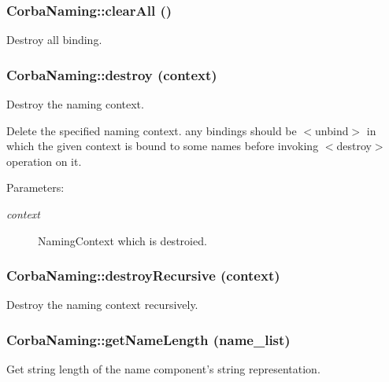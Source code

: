 \subsubsection{\setlength{\rightskip}{0pt plus 5cm}Corba\-Naming::clear\-All ()}\label{classCorbaNaming_CorbaNaminga19}


Destroy all binding. 

\subsubsection{\setlength{\rightskip}{0pt plus 5cm}Corba\-Naming::destroy (context)}\label{classCorbaNaming_CorbaNaminga17}


Destroy the naming context. 

Delete the specified naming context. any bindings should be $<$unbind$>$ in which the given context is bound to some names before invoking $<$destroy$>$ operation on it. \begin{Desc}
\item[Parameters:]
\begin{description}
\item[{\em context}]Naming\-Context which is destroied.\end{description}
\end{Desc}
\subsubsection{\setlength{\rightskip}{0pt plus 5cm}Corba\-Naming::destroy\-Recursive (context)}\label{classCorbaNaming_CorbaNaminga18}


Destroy the naming context recursively. 

\subsubsection{\setlength{\rightskip}{0pt plus 5cm}Corba\-Naming::get\-Name\-Length (name\_\-list)}\label{classCorbaNaming_CorbaNaminga33}


Get string length of the name component's string representation. 

